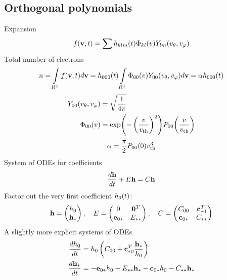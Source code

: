 \documentclass{article}[draft]
\begin{document}
\subsection{Orthogonal polynomials}
Expansion
\begin{align*}
f\of{\vect{v},t} = \sum h_{klm}\of{t} \Phi_{kl}\of{\vr} Y_{lm}\of{\vtheta, \vphi}
\end{align*}
Total number of electrons
\begin{align*}
n = \myint_{R^3} f\of{\vect{v},t} d\vect{v} = h_{000}\of{t} \myint_{R^3} \Phi_{00}\of{\vr} Y_{00}\of{\vtheta, \vphi} d\vect{v} = \alpha h_{000}\of{t}
\end{align*}
\begin{align*}
Y_{00}\of{\vtheta, \vphi} &= \sqrt{\frac1{4\pi}}
\\
\Phi_{00}\of{\vr} &= \exp\of{ -\left( \frac{v}{\vth} \right)^2 } P_{00} \of{\frac{v}{\vth}}
\end{align*}
\begin{align*}
\alpha = \frac\pi{2} P_{00}\of{0} \vth^3
\end{align*}
System of ODEs for coefficients
\begin{align*}
\frac{d \mathbf{h}}{dt} + E \mathbf{h} = C \mathbf{h}
\end{align*}
Factor out the very first coefficient $h_0\of{t}$:
\begin{align*}
\mathbf{h} = 
\begin{pmatrix}
h_0 \\ \mathbf{h}_\ast
\end{pmatrix}
,\quad
E = 
\begin{pmatrix}
0 & \mathbf{0}^T \\
\mathbf{e}_{0\ast} & E_{\ast\ast}
\end{pmatrix}
,\quad
C = 
\begin{pmatrix}
C_{00} & \mathbf{c}_{\ast 0}^T \\
\mathbf{c}_{0\ast} & C_{\ast\ast}
\end{pmatrix}
\end{align*}
A slightly more explicit systems of ODEs
\begin{align*}
\frac{dh_0}{dt} &= h_0 \left(C_{00} + \mathbf{c}_{\ast 0}^T \frac{\mathbf{h}_\ast}{h_0} \right)
\\
\frac{d \mathbf{h}_\ast}{dt} &= - \mathbf{e}_{0\ast} h_0 
- E_{\ast\ast} \mathbf{h}_\ast
- \mathbf{c}_{0\ast} h_0 
- C_{\ast\ast} \mathbf{h}_\ast
\end{align*}
\end{document}
